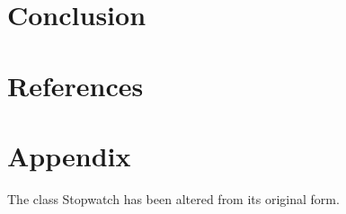 \documentclass[onecolumn, 12pt, article]{IEEEtran}
\numberwithin{case}{problem}
\numberwithin{condition}{problem}
\numberwithin{condition}{subsection}
\numberwithin{definition}{section}
\theoremstyle{remark}
\numberwithin{question}{problem}
\theoremstyle{plain}
\numberwithin{answer}{problem}
\numberwithin{solution}{section}
\numberwithin{equation}{section}%
\begin{document}

\section{Conclusion}


\newpage

\section*{References}



\newpage

\section*{Appendix}




The class Stopwatch has been altered from its original form.
\newline




\end{document}
